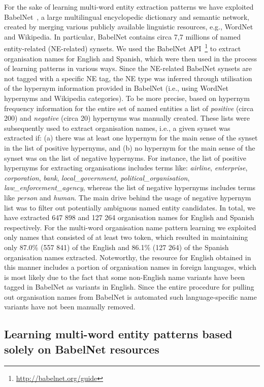 \documentclass[output=paper]{langsci/langscibook}
\begin{document}
For the sake of learning multi-word entity extraction patterns we have exploited BabelNet~\citep{navigli-12},
a large multilingual encyclopedic dictionary and semantic network, created by merging various publicly available linguistic resources, e.g., WordNet and Wikipedia. In particular, BabelNet contains circa 7,7 millions of named entity-related (NE-related) synsets. We used the BabelNet API~\footnote{\url{http://babelnet.org/guide}} to extract organisation names for English and Spanish, which were then used in the process of learning patterns in various ways. Since the NE-related BabelNet synsets are not tagged with a specific NE tag, the NE type was inferred through utilisation of the hypernym information provided in BabelNet (i.e., using WordNet hypernyms and Wikipedia categories). To be more precise, based on hypernym frequency information for the entire set of named entities a list of \textit{positive} (circa 200) and \textit{negative} (circa 20) hypernyms was manually created. These lists were subsequently used to extract organisation names, i.e., a given synset was extracted if: (a) there was at least one hypernym for the main sense of the synset in the list of positive hypernyms, and (b) no hypernym for the main sense of the synset was on the list of negative hypernyms. For instance, the list of positive hypernyms for extracting organisations includes terms like: \textit{airline}, \textit{enterprise}, \textit{corporation}, \textit{bank}, \textit{local\_government}, \textit{political\_organisation}, \textit{law\_enforcement\_agency}, whereas the list of negative hypernyms includes terms like \textit{person} and \textit{human}. The main drive behind the usage of negative hypernym list was to filter out potentially ambiguous named entity candidates. In total, we have extracted 647 898 and 127 264 organisation names for English and Spanish respectively. For the multi-word organisation name pattern learning we exploited only names that consisted of at least two token, which resulted in maintaining only 87.0\% (557 841) of the English and 86.1\% (127 264) of the Spanish organisation names extracted. Noteworthy, the resource for English obtained in this manner includes a portion of organisation names in foreign languages, which is most likely due to the fact that some non-English name variants have been tagged in BabelNet as variants in English. Since the entire procedure for pulling out organisation names from BabelNet is automated such language-specific name variants have not been manually removed.

\subsection{Learning multi-word entity patterns based solely on BabelNet resources}
\label{sec:babelnet-only-derived-patterns}
\end{document}
